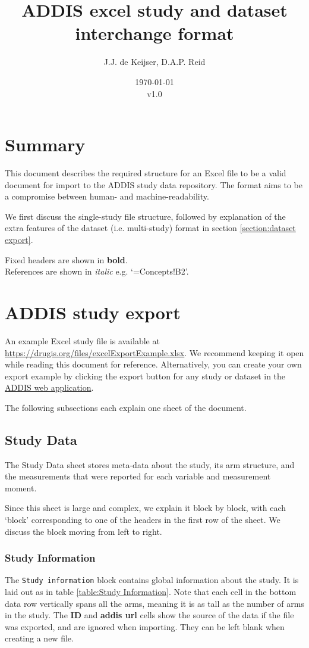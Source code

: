 \documentclass[a4paper,10pt]{article}
\title{ADDIS excel study and dataset interchange format}
\author{J.J. de Keijser, D.A.P. Reid}
\date{\today\\v1.0}
\begin{document}
\maketitle
\section{Summary}

This document describes the required structure for an Excel file to be a valid document for import to the ADDIS study data repository. The format aims to be a compromise between human- and machine-readability.

We first discuss the single-study file structure, followed by explanation of the extra features of the dataset (i.e. multi-study) format in section \ref{section:dataset export}.

Fixed headers are shown in \textbf{bold}.\\
References are shown in \textit{italic} e.g. `=Concepts!B2'.\\

\section{ADDIS study export}
An example Excel study file is available at \url{https://drugis.org/files/excelExportExample.xlsx}. We recommend keeping it open while reading this document for reference. Alternatively, you can create your own export example by clicking the export button for any study or dataset in the \href{https://addis.drugis.org/}{ADDIS web application}.


The following subsections each explain one sheet of the document.

\subsection{Study Data}
The Study Data sheet stores meta-data about the study, its arm structure, and the measurements that were reported for each variable and measurement moment.

Since this sheet is large and complex, we explain it block by block, with each `block' corresponding to one of the headers in the first row of the sheet. We discuss the block moving from left to right.

\subsubsection{Study Information}
The \texttt{Study information} block contains global information about the study. It is laid out as in table \ref{table:Study Information}. Note that each cell in the bottom data row vertically spans all the arms, meaning it is as tall as the number of arms in the study. The \textbf{ID} and \textbf{addis url} cells show the source of the data if the file was exported, and are ignored when importing. They can be left blank when creating a new file.
\end{document}
